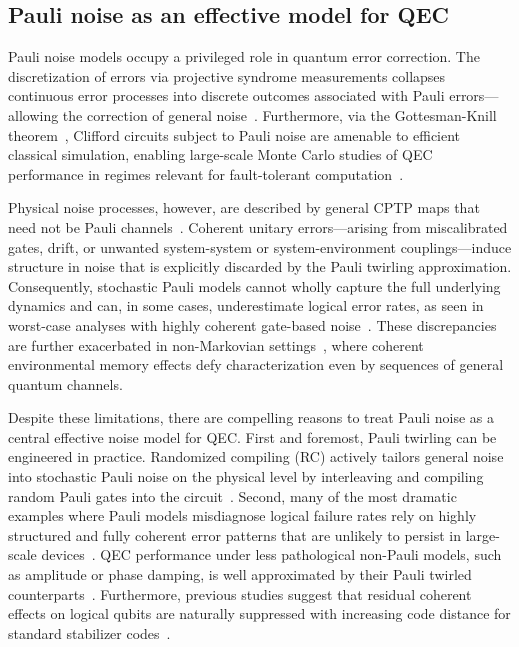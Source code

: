 \documentclass[
    aps,
    prx,
    reprint,
    superscriptaddress,
    longbibliography,
    nofootinbib,
    floatfix,
]{revtex4-2}
\begin{document}
\subsection{Pauli noise as an effective model for QEC}
Pauli noise models occupy a privileged role in quantum error correction. The discretization of errors via projective syndrome measurements collapses continuous error processes into discrete outcomes associated with Pauli errors---allowing the correction of general noise~\cite{knillTheoryQuantumErrorcorrecting1997,gottesmanStabilizerCodesQuantum1997}. Furthermore, via the Gottesman-Knill theorem~\cite{gottesmanHeisenbergRepresentationQuantum1998}, Clifford circuits subject to Pauli noise are amenable to efficient classical simulation, enabling large-scale Monte Carlo studies of QEC performance in regimes relevant for fault-tolerant computation~\cite{aaronsonImprovedSimulationStabilizer2004,gidneyStimFastStabilizer2021}.

Physical noise processes, however, are described by general CPTP maps that need not be Pauli channels~\cite{nielsenQuantumComputationQuantum2010}. Coherent unitary errors---arising from miscalibrated gates, drift, or unwanted system-system or system-environment couplings---induce structure in noise that is explicitly discarded by the Pauli twirling approximation. Consequently, stochastic Pauli models cannot wholly capture the full underlying dynamics and can, in some cases, underestimate logical error rates, as seen in worst-case analyses with highly coherent gate-based noise~\cite{greenbaumModelingCoherentErrors2017,huangPerformanceQuantumError2019}. These discrepancies are further exacerbated in non-Markovian settings~\cite{kobayashiTensornetworkDecodersProcess2024}, where coherent environmental memory effects defy characterization even by sequences of general quantum channels.

Despite these limitations, there are compelling reasons to treat Pauli noise as a central effective noise model for QEC. First and foremost, Pauli twirling can be engineered in practice. Randomized compiling (RC) actively tailors general noise into stochastic Pauli noise on the physical level by interleaving and compiling random Pauli gates into the circuit~\cite{wallmanNoiseTailoringScalable2016,bealeRandomizedCompilingFaulttolerant2023,jainImprovedQuantumError2023}. Second, many of the most dramatic examples where Pauli models misdiagnose logical failure rates rely on highly structured and fully coherent error patterns that are unlikely to persist in large-scale devices~\cite{greenbaumModelingCoherentErrors2017}. QEC performance under less pathological non-Pauli models, such as amplitude or phase damping, is well approximated by their Pauli twirled counterparts~\cite{darmawanTensornetworkSimulationsSurface2017,myersSimulatingGeneralNoise2025}. Furthermore, previous studies suggest that residual coherent effects on logical qubits are naturally suppressed with increasing code distance for standard stabilizer codes~\cite{bealeQuantumErrorCorrection2018,iversonCoherenceLogicalQuantum2020}.
\end{document}
